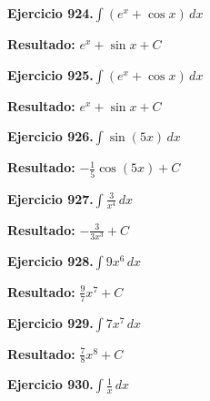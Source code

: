 \documentclass[10pt,a4paper]{article}
\begin{document}
\begin{ejbox}
\textbf{Ejercicio 924.}\quad $\int (e^x + \cos x)\,dx$
\end{ejbox}

\begin{solbox}
\textbf{Resultado:} \(\displaystyle e^x + \sin x + C\)
\end{solbox}

\newpage
\begin{ejbox}
\textbf{Ejercicio 925.}\quad $\int (e^x + \cos x)\,dx$
\end{ejbox}

\begin{solbox}
\textbf{Resultado:} \(\displaystyle e^x + \sin x + C\)
\end{solbox}

\begin{ejbox}
\textbf{Ejercicio 926.}\quad $\int \sin(5x)\,dx$
\end{ejbox}

\begin{solbox}
\textbf{Resultado:} \(\displaystyle -\frac{1}{5}\cos(5x) + C\)
\end{solbox}

\begin{ejbox}
\textbf{Ejercicio 927.}\quad $\int \frac{3}{x^{4}}\,dx$
\end{ejbox}

\begin{solbox}
\textbf{Resultado:} \(\displaystyle -\frac{3}{3x^{3}} + C\)
\end{solbox}

\newpage
\begin{ejbox}
\textbf{Ejercicio 928.}\quad $\int 9x^{6}\,dx$
\end{ejbox}

\begin{solbox}
\textbf{Resultado:} \(\displaystyle \frac{9}{7}x^{7} + C\)
\end{solbox}

\begin{ejbox}
\textbf{Ejercicio 929.}\quad $\int 7x^{7}\,dx$
\end{ejbox}

\begin{solbox}
\textbf{Resultado:} \(\displaystyle \frac{7}{8}x^{8} + C\)
\end{solbox}

\begin{ejbox}
\textbf{Ejercicio 930.}\quad $\int \frac{1}{x}\,dx$
\end{ejbox}
\end{document}
